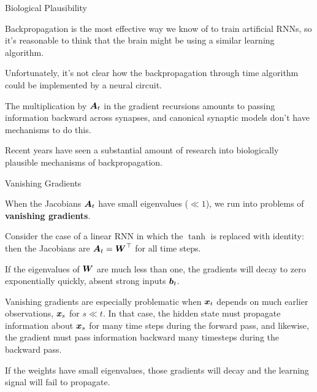 \documentclass[aspectratio=169]{beamer}
\begin{document}
\begin{frame}[t,allowframebreaks]{Biological Plausibility}
    
Backpropagation is the most effective way we know of to train artificial
RNNs, so it's reasonable to think that the brain might be using a
similar learning algorithm. 

Unfortunately, it's not clear how the
backpropagation through time algorithm could be implemented by a neural
circuit. 

The multiplication by \(\boldsymbol{A}_t\) in the gradient recursions
amounts to passing information backward across synapses, and canonical
synaptic models don't have mechanisms to do this. 

Recent years have seen
a substantial amount of research into biologically plausible mechanisms
of backpropagation. 
\end{frame}

\begin{frame}[t,allowframebreaks]{Vanishing Gradients}\label{vanishing-gradients}

When the Jacobians \(\boldsymbol{A}_t\) have small eigenvalues (\(\ll 1\)), we run
into problems of \textbf{vanishing gradients}. 

Consider the case of a
linear RNN in which the \(\tanh\) is replaced with identity: then the
Jacobians are \(\boldsymbol{A}_t = \boldsymbol{W}^\top\) for all time steps. 

If the
eigenvalues of \(\boldsymbol{W}\) are much less than one, the gradients will decay
to zero exponentially quickly, absent strong inputs \(\boldsymbol{b}_t\).

Vanishing gradients are especially problematic when \(\boldsymbol{x}_t\) depends
on much earlier observations, \(\boldsymbol{x}_s\) for \(s \ll t\). In that case,
the hidden state must propagate information about \(\boldsymbol{x}_s\) for many
time steps during the forward pass, and likewise, the gradient must pass
information backward many timesteps during the backward pass. 

If the
weights have small eigenvalues, those gradients will decay and the
learning signal will fail to propagate.
\end{frame}
\end{document}
